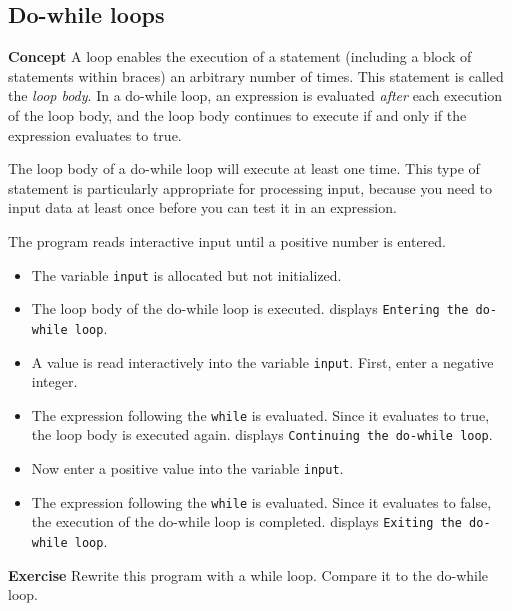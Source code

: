 \subsection{Do-while loops}\label{control.04}

\textbf{Concept} A loop enables the execution of a statement (including a block
of statements within braces) an arbitrary number of times.
This statement is called the \emph{loop body}.
In a do-while loop, an expression is evaluated \emph{after} each
execution of the loop body, and
the loop body continues to execute if and only if the expression evaluates to true.

The loop body of a do-while loop will execute at least one time.
This type of statement is particularly appropriate for processing input,
because you need to input data at least once before you can test it in an expression.


The program reads interactive input until a positive number is entered.

\begin{itemize}
\item The variable \texttt{input} is allocated but not initialized.
\item The loop body of the do-while loop is executed.
\jel{} displays \texttt{Entering the do-while loop}.
\item A value is read interactively into the variable \texttt{input}.
First, enter a negative integer.
\item The expression following the \texttt{while} is evaluated.
Since it evaluates to true, the loop body is executed again.
\jel{} displays \texttt{Continuing the do-while loop}.
\item Now enter a positive value into the variable \texttt{input}.
\item The expression following the \texttt{while} is evaluated.
Since it evaluates to false, the execution of the do-while loop is completed.
\jel{} displays \texttt{Exiting the do-while loop}.
\end{itemize}

\textbf{Exercise} Rewrite this program with a while loop.
Compare it to the do-while loop.
